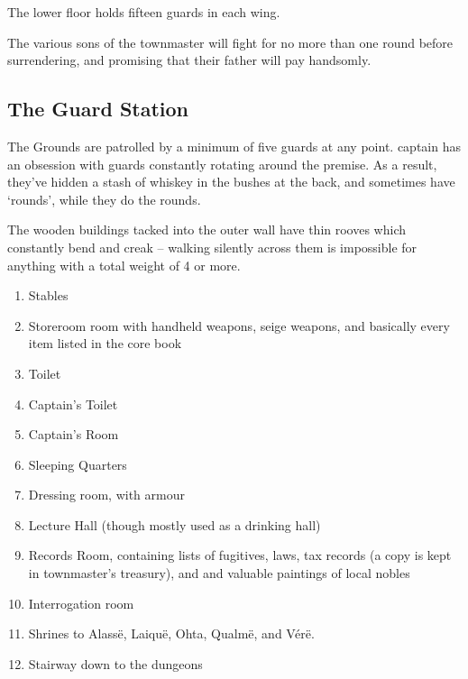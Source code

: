 \begin{multicols}{2}
\begin{enumerate}
\end{enumerate}


The lower floor holds fifteen guards in each wing.

\humansoldier


The various sons of the townmaster will fight for no more than one round before surrendering, and promising that their father will pay handsomly.

\humandiplomat

\label{citadel_alchemist}

\humanalchemist

\subsection{The Guard Station}\label{guardstation}
The Grounds are patrolled by a minimum of five guards at any point.  \Gls{captain} has an obsession with guards constantly rotating around the premise.  As a result, they've hidden a stash of whiskey in the bushes at the back, and sometimes have `rounds', while they do the rounds.

The wooden buildings tacked into the outer wall have thin rooves which constantly bend and creak -- walking silently across them is impossible for anything with a total weight of 4 or more.

\noindent

\begin{enumerate}

	\item{Stables}
	\item{Storeroom room with handheld weapons, seige weapons, and basically every item listed in the core book}
	\item{Toilet}
	\item{Captain's Toilet}
	\item{Captain's Room}
	\item{Sleeping Quarters}
	\item{Dressing room, with armour}
	\item{Lecture Hall (though mostly used as a drinking hall)}
	\item{Records Room, containing lists of fugitives, laws, tax records (a copy is kept in \gls{townmaster}'s treasury), and and valuable paintings of local nobles}
	\item{Interrogation room}
	\item{Shrines to Alass\"{e}, Laiqu\"{e}, Ohta, Qualm\"{e}, and V\'{e}r\"{e}.}
	\item{Stairway down to the dungeons}
\end{enumerate}


\end{multicols}
